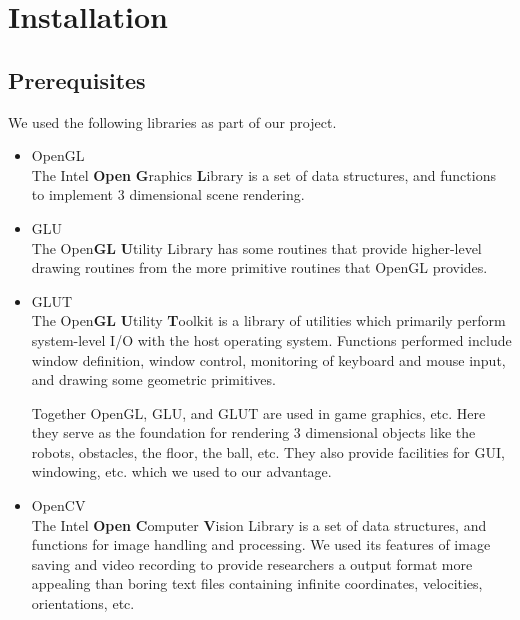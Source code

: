 \documentclass[10pt,a4paper]{article}
\newcommand{\ns}{\vspace{6pt}\noindent}
\begin{document}
\newpage

\section{Installation}
\subsection{Prerequisites}
We used the following libraries as part of our project.

\begin{itemize}
\item OpenGL \\
The Intel {\bf Open} {\bf G}raphics {\bf L}ibrary is a set of data structures, and functions to implement 3 dimensional scene rendering.

\item GLU \\
The Open{\bf GL} {\bf U}tility Library has some routines that provide higher-level drawing routines from the more primitive routines that OpenGL provides.

\item GLUT \\
The Open{\bf GL} {\bf U}tility {\bf T}oolkit is a library of utilities which primarily perform system-level I/O with the host operating system. Functions performed include window definition, window control, monitoring of keyboard and mouse input, and drawing some geometric primitives.

\ns
Together OpenGL, GLU, and GLUT are used in game graphics, etc. Here they serve as the foundation for rendering 3 dimensional objects like the robots, obstacles, the floor, the ball, etc. They also provide facilities for GUI, windowing, etc. which we used to our advantage.

\item OpenCV \\
The Intel {\bf Open} {\bf C}omputer {\bf V}ision Library is a set of data structures, and functions for image handling and processing. We used its features of image saving and video recording to provide researchers a output format more appealing than boring text files containing infinite coordinates, velocities, orientations, etc.
\end{itemize}
\end{document}
